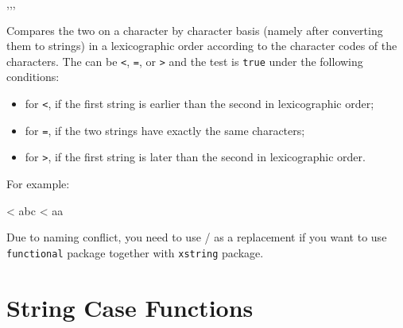 \documentclass[oneside]{book}
\begin{document}
\begin{function}{\strCompare,\strCompareT,\strCompareF,\strCompareTF}
\begin{syntax}
   
    
    
     
\end{syntax}
Compares the two  on a character by character
basis (namely after converting them to strings) in a lexicographic
order according to the character codes of the characters.  The
 can be \verb|<|, \verb|=|, or \verb|>| and the test is
\texttt{true} under the following conditions:
\begin{itemize}[nosep]
\item for \verb|<|, if the first string is earlier than the second in lexicographic order;
\item for \verb|=|, if the two strings have exactly the same characters;
\item for \verb|>|, if the first string is later than the second in lexicographic order.
\end{itemize}
For example:
\begin{demohigh}
 < {abc} {} {}
 < {aa} {} {}
\end{demohigh}
\par
Due to naming conflict, you need to use / as a replacement
if you want to use \verb!functional! package together with \verb!xstring! package.
\end{function}

\section{String Case Functions}
\end{document}
